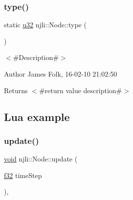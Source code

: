 \begin{DoxyCodeInclude}
\end{DoxyCodeInclude}
\mbox{\label{classnjli_1_1_node_ab11572494b1cda9c05475abad2581082}} 
\subsubsection{\texorpdfstring{type()}{type()}}
{\footnotesize\ttfamily static \mbox{\hyperlink{_util_8h_a10e94b422ef0c20dcdec20d31a1f5049}{u32}} njli\+::\+Node\+::type (\begin{DoxyParamCaption}{ }\end{DoxyParamCaption})\hspace{0.3cm}{\ttfamily [static]}}



$<$\#\+Description\#$>$ 

\begin{DoxyAuthor}{Author}
James Folk, 16-\/02-\/10 21\+:02\+:50
\end{DoxyAuthor}
\begin{DoxyReturn}{Returns}
$<$\#return value description\#$>$
\end{DoxyReturn}
\hypertarget{classnjli_1_1_steering_behavior_wander_ex1}{}\subsection{Lua example}\label{classnjli_1_1_steering_behavior_wander_ex1}

\begin{DoxyCodeInclude}
\end{DoxyCodeInclude}
\mbox{\label{classnjli_1_1_node_a3eb1db3aa2681e4acaf3e9e95fd01e69}} 
\subsubsection{\texorpdfstring{update()}{update()}}
{\footnotesize\ttfamily \mbox{\hyperlink{_thread_8h_af1e856da2e658414cb2456cb6f7ebc66}{void}} njli\+::\+Node\+::update (\begin{DoxyParamCaption}\item[{\mbox{\hyperlink{_util_8h_a5f6906312a689f27d70e9d086649d3fd}{f32}}}]{time\+Step }\end{DoxyParamCaption})\hspace{0.3cm}{\ttfamily [protected]}, {\ttfamily [virtual]}}



